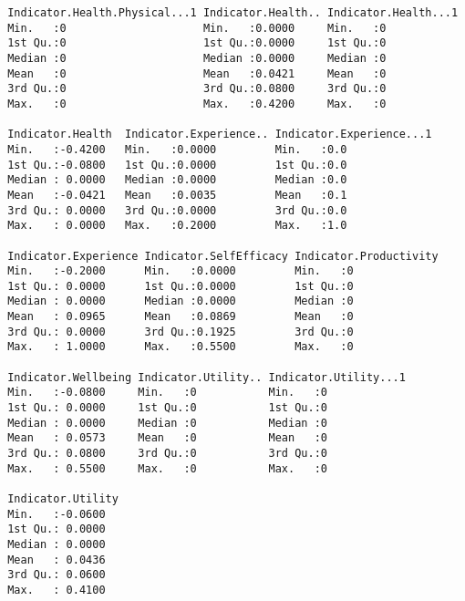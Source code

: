 \documentclass[11pt]{article}
\begin{document}
\begin{verbatim}
 Indicator.Health.Physical...1 Indicator.Health.. Indicator.Health...1
 Min.   :0                     Min.   :0.0000     Min.   :0           
 1st Qu.:0                     1st Qu.:0.0000     1st Qu.:0           
 Median :0                     Median :0.0000     Median :0           
 Mean   :0                     Mean   :0.0421     Mean   :0           
 3rd Qu.:0                     3rd Qu.:0.0800     3rd Qu.:0           
 Max.   :0                     Max.   :0.4200     Max.   :0           
                                                                      
 Indicator.Health  Indicator.Experience.. Indicator.Experience...1
 Min.   :-0.4200   Min.   :0.0000         Min.   :0.0             
 1st Qu.:-0.0800   1st Qu.:0.0000         1st Qu.:0.0             
 Median : 0.0000   Median :0.0000         Median :0.0             
 Mean   :-0.0421   Mean   :0.0035         Mean   :0.1             
 3rd Qu.: 0.0000   3rd Qu.:0.0000         3rd Qu.:0.0             
 Max.   : 0.0000   Max.   :0.2000         Max.   :1.0             
                                                                  
 Indicator.Experience Indicator.SelfEfficacy Indicator.Productivity
 Min.   :-0.2000      Min.   :0.0000         Min.   :0             
 1st Qu.: 0.0000      1st Qu.:0.0000         1st Qu.:0             
 Median : 0.0000      Median :0.0000         Median :0             
 Mean   : 0.0965      Mean   :0.0869         Mean   :0             
 3rd Qu.: 0.0000      3rd Qu.:0.1925         3rd Qu.:0             
 Max.   : 1.0000      Max.   :0.5500         Max.   :0             
                                                                   
 Indicator.Wellbeing Indicator.Utility.. Indicator.Utility...1
 Min.   :-0.0800     Min.   :0           Min.   :0            
 1st Qu.: 0.0000     1st Qu.:0           1st Qu.:0            
 Median : 0.0000     Median :0           Median :0            
 Mean   : 0.0573     Mean   :0           Mean   :0            
 3rd Qu.: 0.0800     3rd Qu.:0           3rd Qu.:0            
 Max.   : 0.5500     Max.   :0           Max.   :0            
                                                              
 Indicator.Utility
 Min.   :-0.0600  
 1st Qu.: 0.0000  
 Median : 0.0000  
 Mean   : 0.0436  
 3rd Qu.: 0.0600  
 Max.   : 0.4100  
                  
    \end{verbatim}
\end{document}
